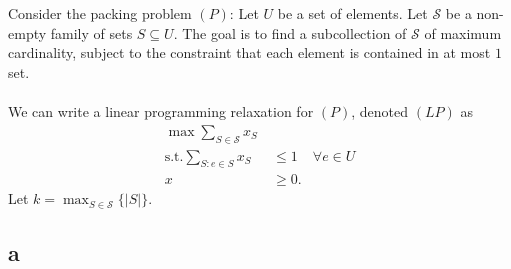 \documentclass[letterpaper,12pt,oneside,onecolumn]{article}
\newcommand{\cS}{\mathcal{S}} \newcommand{\cT}{\mathcal{T}}
\begin{document}
\section{}
\paragraph{}
Consider the packing problem $(P)$: Let $U$ be a set of elements. Let $\cS$ be a non-empty family of sets $S\subseteq U$. The goal is to find a subcollection of $\cS$ of maximum cardinality, subject to the constraint that each element is contained in at most $1$ set.
\paragraph{}
We can write a linear programming relaxation for $(P)$, denoted $(LP)$ as
\begin{align*}
\max \sum_{S\in\cS} x_S\ & \\
\text{s.t.} \sum_{S:e\in S} x_S &\leq 1 &\forall e\in U \\
x&\geq 0.
\end{align*}
Let $k = \max_{S\in \cS} \{ |S|\}$.
\subsection*{a}
\end{document}
